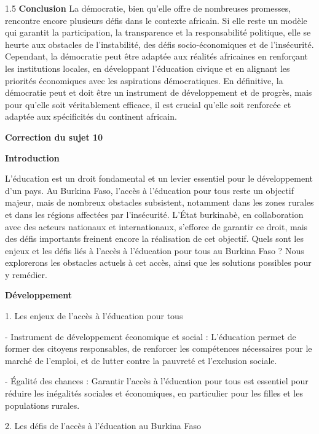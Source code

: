 \documentclass[12pt]{article}
\begin{document}
\begin{spacing}{1.5}
\textbf{Conclusion
}
La démocratie, bien qu'elle offre de nombreuses promesses, rencontre encore plusieurs défis dans le contexte africain. Si elle reste un modèle qui garantit la participation, la transparence et la responsabilité politique, elle se heurte aux obstacles de l'instabilité, des défis socio-économiques et de l'insécurité. Cependant, la démocratie peut être adaptée aux réalités africaines en renforçant les institutions locales, en développant l'éducation civique et en alignant les priorités économiques avec les aspirations démocratiques. En définitive, la démocratie peut et doit être un instrument de développement et de progrès, mais pour qu'elle soit véritablement efficace, il est crucial qu'elle soit renforcée et adaptée aux spécificités du continent africain.



\quad

\quad



\textbf{Correction du sujet 10}

\textbf{Introduction }
  
L'éducation est un droit fondamental et un levier essentiel pour le développement d'un pays. Au Burkina Faso, l'accès à l'éducation pour tous reste un objectif majeur, mais de nombreux obstacles subsistent, notamment dans les zones rurales et dans les régions affectées par l'insécurité. L'État burkinabè, en collaboration avec des acteurs nationaux et internationaux, s'efforce de garantir ce droit, mais des défis importants freinent encore la réalisation de cet objectif. Quels sont les enjeux et les défis liés à l'accès à l'éducation pour tous au Burkina Faso ? Nous explorerons les obstacles actuels à cet accès, ainsi que les solutions possibles pour y remédier.

\textbf{Développement }

1. Les enjeux de l'accès à l'éducation pour tous
 
   - Instrument de développement économique et social : L'éducation permet de former des citoyens responsables, de renforcer les compétences nécessaires pour le marché de l'emploi, et de lutter contre la pauvreté et l'exclusion sociale.  
   
   - Égalité des chances : Garantir l'accès à l'éducation pour tous est essentiel pour réduire les inégalités sociales et économiques, en particulier pour les filles et les populations rurales.

2. Les défis de l'accès à l'éducation au Burkina Faso


\end{spacing}
\end{document}
